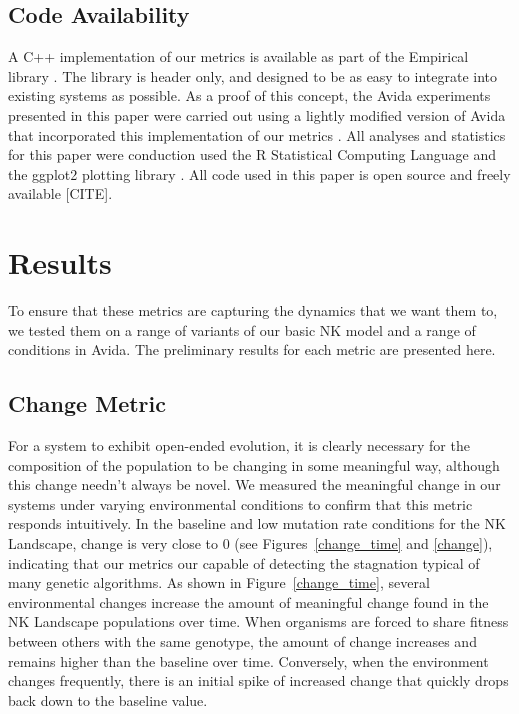 \documentclass[letterpaper]{article}
\begin{document}
\subsection{Code Availability}
A C++ implementation of our metrics is available as part of the Empirical library \citep{charles_ofria_2018_1439475}. The library is header only, and designed to be as easy to integrate into existing systems as possible. As a proof of this concept, the Avida experiments presented in this paper were carried out using a lightly modified version of Avida that incorporated this implementation of our metrics \citep{david_bryson_2018_1439479}. All analyses and statistics for this paper were conduction used the R Statistical Computing Language \citep{r_core_team_r:_2017} and the ggplot2 plotting library \citep{wickham_ggplot2_2016}. All code used in this paper is open source and freely available [CITE].


\section{Results}
To ensure that these metrics are capturing the dynamics that we want them to, we tested them on a range of variants of our basic NK model and a range of conditions in Avida. The preliminary results for each metric are presented here.

\subsection{Change Metric}
For a system to exhibit open-ended evolution, it is clearly necessary for the composition of the population to be changing in some meaningful way, although this change needn't always be novel. We measured the meaningful change in our systems under varying environmental conditions to confirm that this metric responds intuitively. In the baseline and low mutation rate conditions for the NK Landscape, change is very close to 0 (see Figures~\ref{change_time} and \ref{change}), indicating that our metrics our capable of detecting the stagnation typical of many genetic algorithms. As shown in Figure~\ref{change_time}, several environmental changes increase the amount of meaningful change found in the NK Landscape populations over time. When organisms are forced to share fitness between others with the same genotype, the amount of change increases and remains higher than the baseline over time. Conversely, when the environment changes frequently, there is an initial spike of increased change that quickly drops back down to the baseline value.
\end{document}
